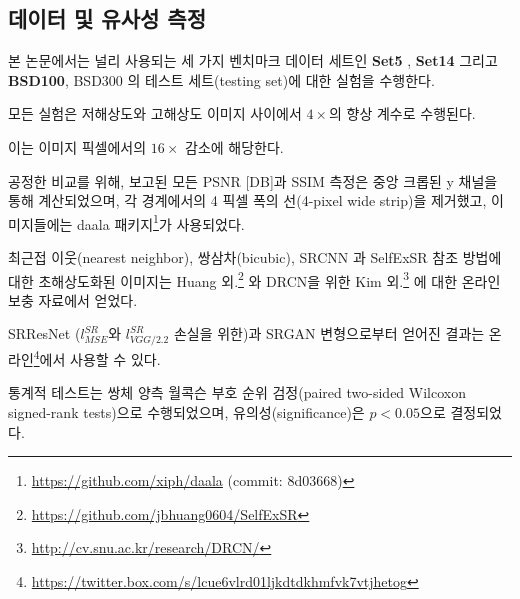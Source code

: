 \documentclass[10pt,twocolumn,letterpaper]{article}
\newcommand{\kor}[1]{#1}
\newcommand{\eng}[1]{}
\begin{document}
\subsection{\eng{Data and similarity measures}\kor{데이터 및 유사성 측정}}
\label{subsec:data}
\eng{
We perform experiments on three widely used benchmark datasets \textbf{Set5} \cite{bevilacqua2012low}, \textbf{Set14} \cite{zeyde2012single} and \textbf{BSD100}, the testing set of BSD300 \cite{MartinFTM01}.
}\kor{
본 논문에서는 널리 사용되는 세 가지 벤치마크 데이터 세트인 \textbf{Set5} \cite{bevilacqua2012low}, \textbf{Set14} \cite{zeyde2012single} 그리고 \textbf{BSD100}, BSD300 \cite{MartinFTM01}의 테스트 세트(testing set)에 대한 실험을 수행한다.
} \eng{
All experiments are performed with a scale factor of $4\times$ between low- and high-resolution images.
}\kor{
모든 실험은 저해상도와 고해상도 이미지 사이에서 $4\times$의 향상 계수로 수행된다.
} \eng{
This corresponds to a $16\times$ reduction in image pixels.
}\kor{
이는 이미지 픽셀에서의 $16\times$ 감소에 해당한다.
} \eng{
For fair comparison, all reported \ac{PSNR} [dB] and \ac{SSIM} \cite{Wang2004} measures were calculated on the y-channel of center-cropped, removal of a 4-pixel wide strip from each border, images using the daala package\footnote{\url{https://github.com/xiph/daala} (commit: 8d03668)}.
}\kor{
공정한 비교를 위해, 보고된 모든 \ac{PSNR} [DB]과 \ac{SSIM} \cite{Wang2004} 측정은 중앙 크롭된 y 채널을 통해 계산되었으며, 각 경계에서의 4 픽셀 폭의 선(4-pixel wide strip)을 제거했고, 이미지들에는 daala 패키지\footnote{\url{https://github.com/xiph/daala} (commit: 8d03668)}가 사용되었다.
} \eng{
Super-resolved images for the reference methods, including nearest neighbor, bicubic, SRCNN \cite{dong2014learning} and SelfExSR \cite{Huang15selfexemplars}, were obtained from online material supplementary to Huang et al.\footnote{\url{https://github.com/jbhuang0604/SelfExSR}} \cite{Huang15selfexemplars} and for DRCN from Kim et al.\footnote{\url{http://cv.snu.ac.kr/research/DRCN/}} \cite{kim2016deeply}.
}\kor{
최근접 이웃(nearest neighbor), 쌍삼차(bicubic), SRCNN \cite{dong2014learning}과 SelfExSR \cite{Huang15selfexemplars} 참조 방법에 대한 초해상도화된 이미지는 Huang 외.\footnote{\url{https://github.com/jbhuang0604/SelfExSR}} \cite{Huang15selfexemplars}와 DRCN을 위한 Kim 외.\footnote{\url{http://cv.snu.ac.kr/research/DRCN/}} \cite{kim2016deeply}에 대한 온라인 보충 자료에서 얻었다.
}
\eng{
Results obtained with SRResNet (for losses: $l^{SR}_{MSE}$ and $l^{SR}_{VGG/2.2}$) and the SRGAN variants are available online\footnote{\url{https://twitter.box.com/s/lcue6vlrd01ljkdtdkhmfvk7vtjhetog}}.
}\kor{
SRResNet ($l^{SR}_{MSE}$와 $l^{SR}_{VGG/2.2}$ 손실을 위한)과 SRGAN 변형으로부터 얻어진 결과는 온라인\footnote{\url{https://twitter.box.com/s/lcue6vlrd01ljkdtdkhmfvk7vtjhetog}}에서 사용할 수 있다.
}
\eng{
Statistical tests were performed as paired two-sided Wilcoxon signed-rank tests and significance determined at $p<0.05$.
}\kor{
통계적 테스트는 쌍체 양측 월콕슨 부호 순위 검정(paired two-sided Wilcoxon signed-rank tests)으로 수행되었으며, 유의성(significance)은 $p<0.05$으로 결정되었다.
}
\end{document}
